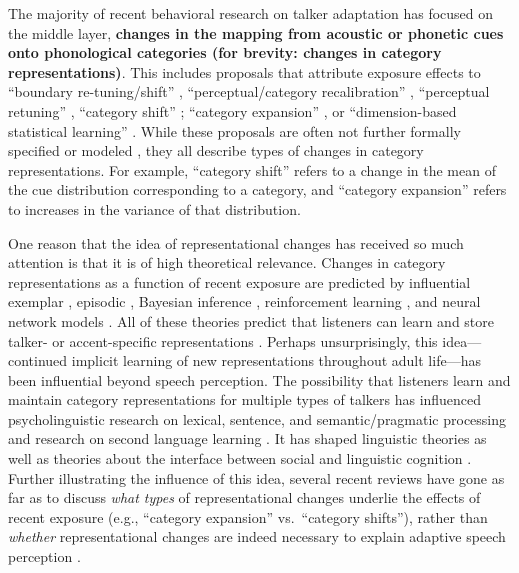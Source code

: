 \documentclass[
  11pt,
  man,floatsintext]{apa6}
\begin{document}
The majority of recent behavioral research on talker adaptation has focused on the middle layer, \textbf{changes in the mapping from acoustic or phonetic cues onto phonological categories (for brevity: changes in category representations)}. This includes proposals that attribute exposure effects to ``boundary re-tuning/shift'' \autocites[e.g.,][]{norris2003,reinisch2013}, ``perceptual/category recalibration'' \autocites[e.g.,][]{kraljic-samuel2006,reinisch-holt2013,samuel2016,vroomen-baart2009}, ``perceptual retuning'' \autocite{jesse-mcqueen2011,mcqueen2006,mitterer2013}, ``category shift'' \autocite{lindsay2022,sawusch-pisoni1976}; ``category expansion'' \autocite{schmale2012}, or ``dimension-based statistical learning'' \autocite{idemaru-holt2011,lehet-holt2020,liu-holt2015}. While these proposals are often not further formally specified or modeled \autocites[for notable exceptions, see][]{apfelbaum-mcmurray2015,clayards2008,harmon2019,hitczenko-feldman2016,kleinschmidt-jaeger2015,lancia-winter2013,xie2021cognition}, they all describe types of changes in category representations. For example, ``category shift'' refers to a change in the mean of the cue distribution corresponding to a category, and ``category expansion'' refers to increases in the variance of that distribution.

One reason that the idea of representational changes has received so much attention is that it is of high theoretical relevance. Changes in category representations as a function of recent exposure are predicted by influential exemplar \autocite{apfelbaum-mcmurray2015,johnson2006}, episodic \autocite{goldinger1998}, Bayesian inference \autocite{kleinschmidt-jaeger2015}, reinforcement learning \autocite{harmon2019}, and neural network models \autocite{lancia-winter2013}. All of these theories predict that listeners can learn and store talker- or accent-specific representations \autocites[see also][]{bradlow-bent2008,baeseberk2013,tzeng2016}. Perhaps unsurprisingly, this idea---continued implicit learning of new representations throughout adult life---has been influential beyond speech perception. The possibility that listeners learn and maintain category representations for multiple types of talkers has influenced psycholinguistic research on lexical, sentence, and semantic/pragmatic processing \autocites{chang2012,fine2013,kaschak2004,pogue2016,prasad2021,ryskin2019,schuster-degen2020}[ for review, see][]{brown-schmidt2015} and research on second language learning \autocites[for reviews, see][]{kaan-chun2018,pajak2016}. It has shaped linguistic theories \autocites[e.g.,][]{bybee2001,goldinger-azuma2004,hay2019,magnuson-nusbaum2007,pierrehumbert2001} as well as theories about the interface between social and linguistic cognition \autocites[e.g.,][]{babel2019,creel-bregman2011,foulkes-hay2015,hanulikova2012,sumner2014}. Further illustrating the influence of this idea, several recent reviews have gone as far as to discuss \emph{what types} of representational changes underlie the effects of recent exposure (e.g., ``category expansion'' vs.~``category shifts''), rather than \emph{whether} representational changes are indeed necessary to explain adaptive speech perception \autocites[e.g.,][]{baeseberk2020,bent-baeseberk2021,schertz-clare2020}.
\end{document}
